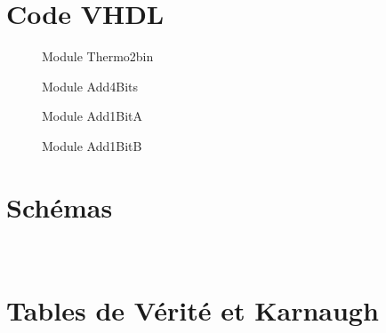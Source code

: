 \newpage
\appendix
\section{Code VHDL}

\begin{figure}[H]
  \tiny
\centering
\begin{varwidth}{\linewidth}
  
\end{varwidth}
\caption{Module Thermo2bin}
\end{figure}

\begin{figure}[H]
  \tiny
\centering
\begin{varwidth}{\linewidth}
  
\end{varwidth}
\caption{Module Add4Bits}
\end{figure}

\begin{figure}[H]
  \tiny
\centering
\begin{varwidth}{\linewidth}
  
\end{varwidth}
\caption{Module Add1BitA}
\end{figure}

\begin{figure}[H]
  \tiny
\centering
\begin{varwidth}{\linewidth}
  
\end{varwidth}
\caption{Module Add1BitB}
\end{figure}

\section{Schémas}

\\


\section{Tables de Vérité et Karnaugh}

\\
